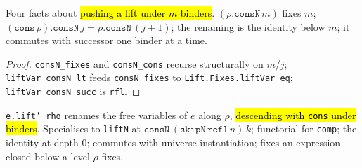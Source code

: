 \begin{lemma}
\label{fam:lift-consn}
\leanok
{} 

 Four facts about \hl{pushing a lift under $m$ binders}.
$(\rho.\texttt{consN}\,m)$ fixes $m$; $(\texttt{cons}\,\rho).\texttt{consN}\,j =
\rho.\texttt{consN}\,(j{+}1)$; the renaming is the identity below $m$; it commutes with
successor one binder at a time.
\end{lemma}
\begin{proof}
\leanok
{} \texttt{consN\_fixes} and \texttt{consN\_cons} recurse structurally on $m$/$j$;
\texttt{liftVar\_consN\_lt} feeds \texttt{consN\_fixes} to \texttt{Lift.Fixes.liftVar\_eq};
\texttt{liftVar\_consN\_succ} is \texttt{rfl}.
\end{proof}

\begin{definition}
\label{def:lift-prime}
\leanok
{}

 \texttt{e.lift' rho} renames the free variables of $e$ along $\rho$,
\hl{descending with \texttt{cons} under binders}.
Specialises to \texttt{liftN} at $\texttt{consN}\,(\texttt{skipN}\,\texttt{refl}\,n)\,k$;
functorial for \texttt{comp}; the identity at depth $0$; commutes with universe
instantiation; fixes an expression closed below a level $\rho$ fixes.
\end{definition}


